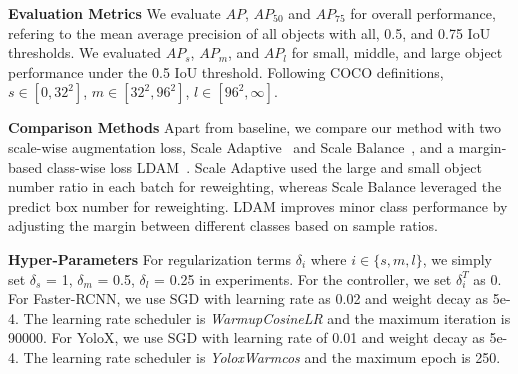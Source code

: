 \documentclass{article}
\begin{document}
\noindent \textbf{Evaluation Metrics} We evaluate $AP$, $AP_{50}$ and $AP_{75}$ for overall performance, refering to the mean average precision of all objects with all, 0.5, and 0.75 IoU thresholds. We evaluated $AP_{s}$, $AP_{m}$, and $AP_{l}$ for small, middle, and large object performance under the 0.5 IoU threshold. Following COCO definitions, $s \in [0, 32^2]$, $m \in [32^2, 96^2]$, $l \in [96^2, \infty]$.

\noindent \textbf{Comparison Methods} Apart from baseline, we compare our method with two scale-wise augmentation loss, Scale Adaptive~\cite{lv2020small} and Scale Balance~\cite{shuang2021scale}, and a margin-based class-wise loss LDAM~\cite{cao2019learning}. Scale Adaptive used the large and small object number ratio in each batch for reweighting, whereas Scale Balance leveraged the predict box number for reweighting. LDAM improves minor class performance by adjusting the margin between different classes based on sample ratios.

\noindent \textbf{Hyper-Parameters} For regularization terms $\delta_i$ where $i \in \{s, m, l\}$, we simply set $\delta_{s}$ = 1, $\delta_{m}$ = 0.5, $\delta_{l}$ = 0.25 in experiments. For the controller, we set $\delta^{T}_{i}$ as 0. For Faster-RCNN, we use SGD with learning rate as 0.02 and weight decay as 5e-4. The learning rate scheduler is \textit{WarmupCosineLR} and the maximum iteration is 90000. For YoloX, we use SGD with learning rate of 0.01 and weight decay as 5e-4. The learning rate scheduler is \textit{YoloxWarmcos} and the maximum epoch is 250.
\end{document}
